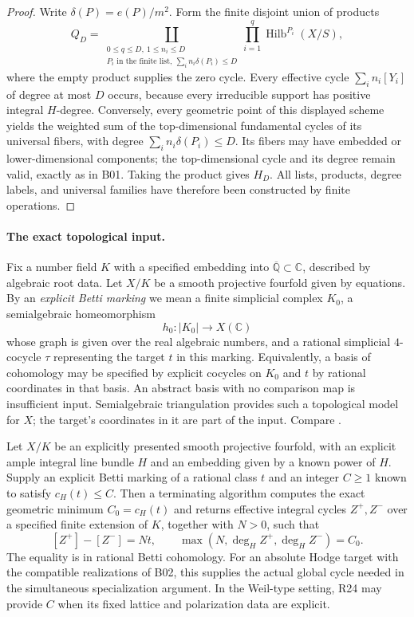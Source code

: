 \begin{proof}
Write $\delta(P)=e(P)/m^2$. Form the finite disjoint union of products
\[
 Q_D=\coprod_{\substack{0\leq q\leq D,\ 1\leq n_i\leq D\\
                        P_i\text{ in the finite list},\
                        \sum_i n_i\delta(P_i)\leq D}}
       \prod_{i=1}^q\operatorname{Hilb}^{P_i}(X/S),
\]
where the empty product supplies the zero cycle. Every effective cycle
$\sum_i n_i[Y_i]$ of degree at most $D$ occurs, because every
irreducible support has positive integral $H$-degree. Conversely,
every geometric point of this displayed scheme yields the weighted
sum of the top-dimensional fundamental cycles of its universal
fibers, with degree $\sum_i n_i\delta(P_i)\leq D$.
Its fibers may have embedded or lower-dimensional components; the
top-dimensional cycle and its degree remain valid, exactly as in B01.
Taking the product gives $H_D$. All lists, products, degree labels,
and universal families have therefore been constructed by finite
operations.
\end{proof}

\paragraph{The exact topological input.}
Fix a number field $K$ with a specified embedding into
$\overline{\mathbb Q}\subset\mathbb C$, described by algebraic root
data. Let $X/K$ be a smooth projective fourfold given by equations.
By an \emph{explicit Betti marking} we mean a finite simplicial
complex $K_0$, a semialgebraic homeomorphism
\[
                  h_0:|K_0|\longrightarrow X(\mathbb C)
\]
whose graph is given over the real algebraic numbers, and a rational
simplicial $4$-cocycle $\tau$ representing the target $t$ in this
marking. Equivalently, a basis of cohomology may be specified by
explicit cocycles on $K_0$ and $t$ by rational coordinates in that
basis. An abstract basis with no comparison map is insufficient input.
Semialgebraic triangulation provides such a topological model for
$X$; the target's coordinates in it are part of the input. Compare
\cite[Proposition 7.8, author PDF pp.~8--9]{PoonenTestaVanLuijk}.

\begin{theorem}[R43: computing the generic minimum from a marked class]
\label{thm:R43}
Let $X/K$ be an explicitly presented smooth projective fourfold,
with an explicit ample integral line bundle $H$ and an embedding
given by a known power of $H$. Supply an explicit Betti marking of a
rational class $t$ and an integer $C\geq1$ known to satisfy
$c_H(t)\leq C$. Then a terminating algorithm computes the exact
geometric minimum $C_0=c_H(t)$ and returns effective integral cycles
$Z^+,Z^-$ over a specified finite extension of $K$, together with
$N>0$, such that
\[
        [Z^+]-[Z^-]=Nt,\qquad
        \max(N,\deg_H Z^+,\deg_H Z^-)=C_0.
\]
The equality is in rational Betti cohomology. For an absolute Hodge
target with the compatible realizations of B02, this supplies the
actual global cycle needed in the simultaneous specialization
argument. In the Weil-type setting, R24 may provide $C$ when its
fixed lattice and polarization data are explicit.
\end{theorem}

